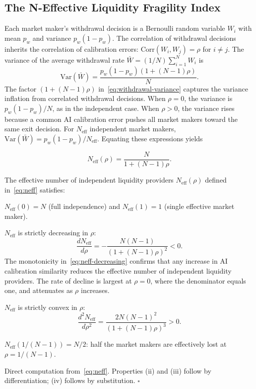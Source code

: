 \subsection{The N-Effective Liquidity Fragility Index}

Each market maker's withdrawal decision is a Bernoulli random variable $W_i$ with mean $p_w$ and variance $p_w(1-p_w)$. The correlation of withdrawal decisions inherits the correlation of calibration errors: $\mathrm{Corr}(W_i, W_j) = \rho$ for $i \neq j$. The variance of the average withdrawal rate $\bar{W} = (1/N)\sum_{i=1}^N W_i$ is
\begin{equation}\label{eq:withdrawal-variance}
  \mathrm{Var}(\bar{W}) = \frac{p_w(1-p_w)(1+(N-1)\rho)}{N}.
\end{equation}
The factor $(1+(N-1)\rho)$ in~\eqref{eq:withdrawal-variance} captures the variance inflation from correlated withdrawal decisions. When $\rho = 0$, the variance is $p_w(1-p_w)/N$, as in the independent case. When $\rho > 0$, the variance rises because a common AI calibration error pushes all market makers toward the same exit decision. For $N_{\text{eff}}$ independent market makers, $\mathrm{Var}(\bar{W}) = p_w(1-p_w)/N_{\text{eff}}$. Equating these expressions yields

\begin{equation}\label{eq:neff}
  N_{\text{eff}}(\rho) = \frac{N}{1+(N-1)\rho}.
\end{equation}

\begin{proposition}\label{prop:neff}
  The effective number of independent liquidity providers $N_{\text{eff}}(\rho)$ defined in~\eqref{eq:neff} satisfies:

   $N_{\text{eff}}(0) = N$ (full independence) and $N_{\text{eff}}(1) = 1$ (single effective market maker).

   $N_{\text{eff}}$ is strictly decreasing in $\rho$:
  \begin{equation}\label{eq:neff-decreasing}
    \frac{dN_{\text{eff}}}{d\rho} = -\frac{N(N-1)}{(1+(N-1)\rho)^2} < 0.
  \end{equation}
  The monotonicity in~\eqref{eq:neff-decreasing} confirms that any increase in AI calibration similarity reduces the effective number of independent liquidity providers. The rate of decline is largest at $\rho = 0$, where the denominator equals one, and attenuates as $\rho$ increases.

   $N_{\text{eff}}$ is strictly convex in $\rho$:
  \begin{equation}\label{eq:neff-convex}
    \frac{d^2N_{\text{eff}}}{d\rho^2} = \frac{2N(N-1)^2}{(1+(N-1)\rho)^3} > 0.
  \end{equation}

   $N_{\text{eff}}(1/(N-1)) = N/2$: half the market makers are effectively lost at $\rho = 1/(N-1)$.

   Direct computation from~\eqref{eq:neff}. Properties (ii) and (iii) follow by differentiation; (iv) follows by substitution. $\square$
\end{proposition}

